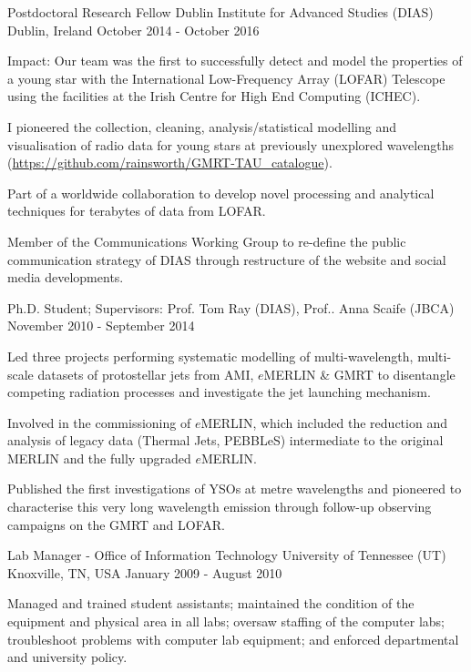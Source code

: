\begin{cventries}
\cventry
    {Postdoctoral Research Fellow}
    {Dublin Institute for Advanced Studies (DIAS)}
    {Dublin, Ireland}
    {October 2014 - October 2016}
    {
      \begin{cvitems}
        \item{Impact: Our team was the first to successfully detect and model the properties of a young star with the International Low-Frequency Array (LOFAR) Telescope using the facilities at the Irish Centre for High End Computing (ICHEC).}        
        \item {I pioneered the collection, cleaning, analysis/statistical modelling and visualisation of radio data for young stars at previously unexplored wavelengths (\url{https://github.com/rainsworth/GMRT-TAU_catalogue}).}
        \item {Part of a worldwide collaboration to develop novel processing and analytical techniques for terabytes of data from LOFAR.}
        \item {Member of the Communications Working Group to re-define the public communication strategy of DIAS through restructure of the website and social media developments.}
      \end{cvitems}
    }\vspace{-15pt}

  \cventry
    {Ph.D. Student; Supervisors: Prof. Tom Ray (DIAS), Prof.. Anna Scaife (JBCA)}
    {}
    {}
    {November 2010 - September 2014}
    {
      \begin{cvitems}
        \item {Led three projects performing systematic modelling of multi-wavelength, multi-scale datasets of protostellar jets from AMI, $e$MERLIN \& GMRT to disentangle competing radiation processes and investigate the jet launching mechanism.}
        \item {Involved in the commissioning of $e$MERLIN, which included the reduction and analysis of legacy data (Thermal Jets, PEBBLeS) intermediate to the original MERLIN and the fully upgraded $e$MERLIN.}
        \item {Published the first investigations of YSOs at metre wavelengths and pioneered to characterise this very long wavelength emission through follow-up observing campaigns on the GMRT and LOFAR.}
      \end{cvitems} 
    }\vspace{-6pt}

\cventry
    {Lab Manager - Office of Information Technology}
    {University of Tennessee (UT)}
    {Knoxville, TN, USA}
    {January 2009 - August 2010}
    {
      \begin{cvitems}
        \item {Managed and trained student assistants; maintained the condition of the equipment and physical area in all labs; oversaw staffing of the computer labs; troubleshoot problems with computer lab equipment; and enforced departmental and university policy.}
      \end{cvitems}
    }\vspace{-15pt}


\end{cventries}
